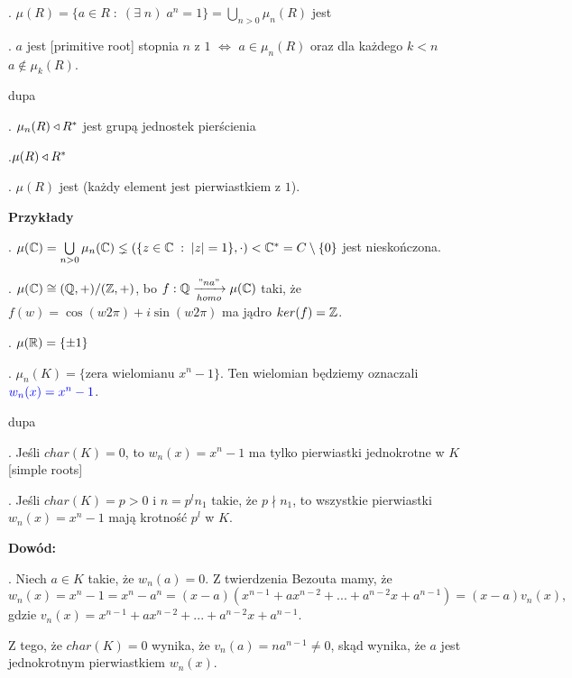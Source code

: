 . $\mu(R)=\{a\in R\;:\;(\exists\;n)\;a^n=1\}=\bigcup\limits_{n>0}\mu_n(R)$ jest 

. $a$ jest  [primitive root] stopnia $n$ z $1$ $\iff$ $a\in\mu_n(R)$ oraz dla każdego $k<n$ $a\notin\mu_k(R)$.

\begin{uwaga}{\color{back}dupa}

. $\mu_n(R)\triangleleft R^*$ jest grupą jednostek pierścienia

.$\mu(R)\triangleleft R^*$

. $\mu(R)$ jest  (każdy element jest pierwiastkiem z $1$).
\end{uwaga}

\textbf{Przykłady}

. $\mu(\mathbb{C})=\bigcup\limits_{n>0}\mu_n(\mathbb{C})\lneq(\{z\in\mathbb{C}\;:\;|z|=1\},\cdot)<\mathbb{C}^*=C\setminus\{0\}$ jest nieskończona.

. $\mu(\mathbb{C})\cong(\mathbb{Q},+)/(\mathbb{Z},+)$, bo $f:\mathbb{Q}\xrightarrow[homo]{"na"}\mu(\mathbb{C})$ taki, że $f(w)=\cos(w2\pi)+i\sin(w2\pi)$ ma jądro $ker(f)=\mathbb{Z}$.

. $\mu(\mathbb{R})=\{\pm1\}$

. $\mu_n(K)=\{\text{zera wielomianu }x^n-1\}$. Ten wielomian będziemy oznaczali $\color{blue}w_n(x)=x^n-1$.

\begin{uwaga}{\color{back}dupa}
    \label{uwaga:2:6}

. Jeśli $char(K)=0$, to $w_n(x)=x^n-1$ ma tylko pierwiastki jednokrotne w $K$ [simple roots]

. Jeśli $char(K)=p>0$ i $n=p^ln_1$ takie, że $p\nmid n_1$, to wszystkie pierwiastki $w_n(x)=x^n-1$ mają krotność $p^l$ w $K$.
\end{uwaga}

\textbf{Dowód:}

. Niech $a\in K$ takie, że $w_n(a)=0$. Z twierdzenia Bezouta mamy, że
$$w_n(x)=x^n-1=x^n-a^n=(x-a)(x^{n-1}+ax^{n-2}+...+a^{n-2}x+a^{n-1})=(x-a)v_n(x),$$
gdzie $v_n(x)=x^{n-1}+ax^{n-2}+...+a^{n-2}x+a^{n-1}$.

Z tego, że $char(K)=0$ wynika, że $v_n(a)=na^{n-1}\neq0$, skąd wynika, że $a$ jest jednokrotnym pierwiastkiem $w_n(x)$.


